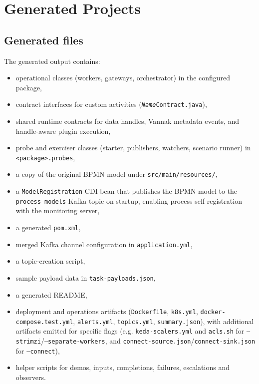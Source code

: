 \section{Generated Projects}
\label{sec:GeneratedProjects}

\subsection{Generated files}

The generated output contains:
\begin{itemize}
\item operational classes (workers, gateways, orchestrator) in the configured package,
\item contract interfaces for custom activities (\texttt{\textit{Name}Contract.java}),
\item shared runtime contracts for data handles, Vannak metadata events, and
      handle-aware plugin execution,
\item probe and exerciser classes (starter, publishers, watchers, scenario runner)
in \texttt{<package>.probes},
\item a copy of the original BPMN model under \texttt{src/main/resources/},
\item a \texttt{ModelRegistration} CDI bean that publishes the BPMN model to the
      \texttt{process-models} Kafka topic on startup, enabling process
      self-registration with the monitoring server,
\item a generated \texttt{pom.xml},
\item merged Kafka channel configuration in \texttt{application.yml},
\item a topic-creation script,
\item sample payload data in \texttt{task-payloads.json},
\item a generated README,
\item deployment and operations artifacts (\texttt{Dockerfile}, \texttt{k8s.yml},
      \texttt{docker-compose.test.yml}, \texttt{alerts.yml}, \texttt{topics.yml},
      \texttt{summary.json}), with additional artifacts emitted for specific flags
      (e.g. \texttt{keda-scalers.yml} and \texttt{acls.sh} for
      \texttt{--strimzi}/\texttt{--separate-workers}, and
      \texttt{connect-source.json}/\texttt{connect-sink.json} for \texttt{--connect}),
\item helper scripts for demos, inputs, completions, failures, escalations and observers.
\end{itemize}

